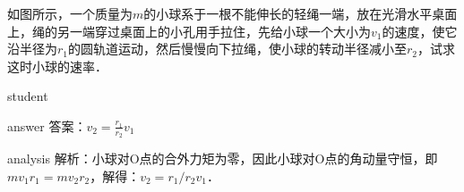 \begin{example}
	如图所示，一个质量为$ m $的小球系于一根不能伸长的轻绳一端，放在光滑水平桌面上，绳的另一端穿过桌面上的小孔用手拉住，先给小球一个大小为$ v_1 $的速度，使它沿半径为$ r_1 $的圆轨道运动，然后慢慢向下拉绳，使小球的转动半径减小至$ r_2 $，试求这时小球的速率．
	
	\begin{taggedblock}{student}
		\vspace*{2cm}
	\end{taggedblock}
	
	
	\begin{taggedblock}{answer}
		答案：$ v_2 = \frac{r_1}{r_2}v_1 $
	\end{taggedblock}
	
	
	\begin{taggedblock}{analysis}
		解析：小球对O点的合外力矩为零，因此小球对O点的角动量守恒，即$ mv_1 r_1=mv_2 r_2 $，解得$ ：v_2=r_1/r_2  v_1 $．
	\end{taggedblock}
\end{example}

